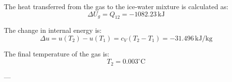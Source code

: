 The heat transferred from the gas to the ice-water mixture is calculated as:  
\[
\Delta U_{g} = Q_{12} = -1082.23 \, \text{kJ}
\]

The change in internal energy is:  
\[
\Delta u = u(T_2) - u(T_1) = c_V (T_2 - T_1) = -31.496 \, \text{kJ/kg}
\]

The final temperature of the gas is:  
\[
T_2 = 0.003^\circ \text{C}
\]

---